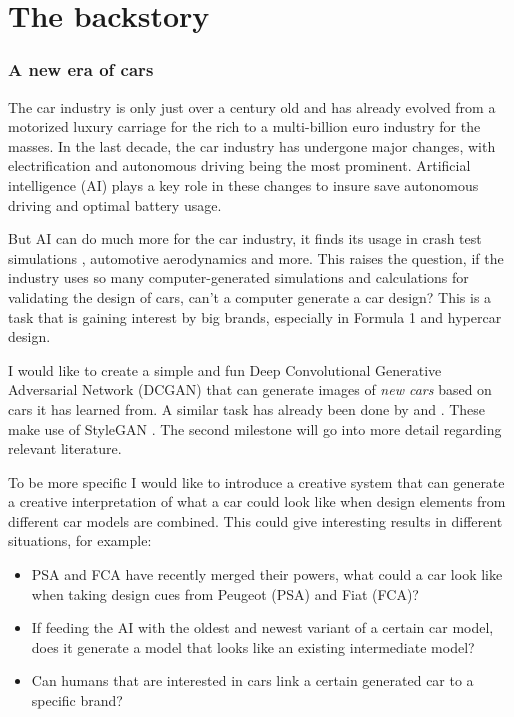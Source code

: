 \part{The backstory}
\label{part:backstory}


\section{A new era of cars}
\label{sec:new_era}

The car industry is only just over a century old and has already evolved from a motorized luxury carriage for the rich to a multi-billion euro industry for the masses.
In the last decade, the car industry has undergone major changes, with electrification and autonomous driving being the most prominent.
Artificial intelligence (AI) plays a key role in these changes to insure save autonomous driving and optimal battery usage.

But AI can do much more for the car industry, it finds its usage in crash test simulations \citep{crashtest}, automotive aerodynamics \citep{carearo} and more.
This raises the question, if the industry uses so many computer-generated simulations and calculations for validating the design of cars, can't a computer generate a car design?
This is a task that is gaining interest by big brands, especially in Formula 1 and hypercar design.

I would like to create a simple and fun Deep Convolutional Generative Adversarial Network (DCGAN) that can generate images of \textit{new cars} based on cars it has learned from. 
A similar task has already been done by \citet{cnnnewcar} and \citet{cybertruckguess}. 
These make use of StyleGAN \citep{stylegan}. 
The second milestone will go into more detail regarding relevant literature.

To be more specific I would like to introduce a creative system that can generate a creative interpretation of what a car could look like when design elements from different car models are combined. 
This could give interesting results in different situations, for example:
\begin{itemize}
    \item PSA and FCA have recently merged their powers, what could a car look like when taking design cues from Peugeot (PSA) and Fiat (FCA)?
    \item If feeding the AI with the oldest and newest variant of a certain car model, does it generate a model that looks like an existing intermediate model?
    \item Can humans that are interested in cars link a certain generated car to a specific brand? 
\end{itemize}



